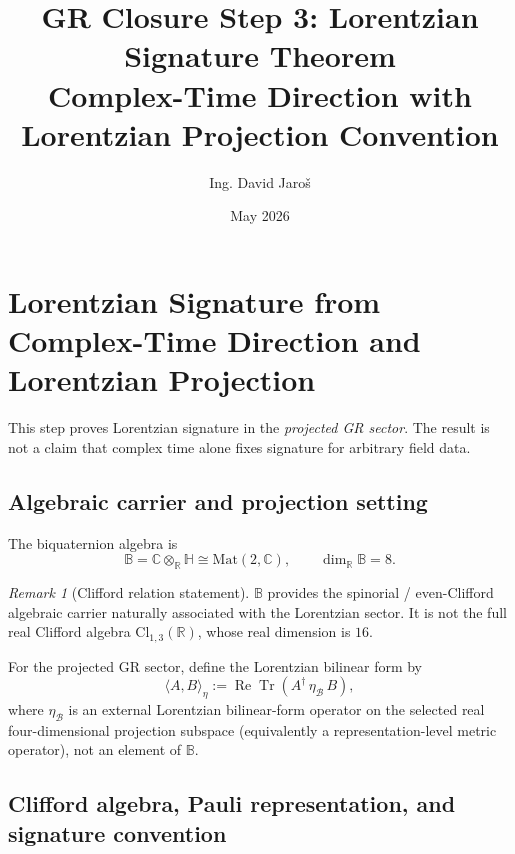 \documentclass[12pt]{article}
\title{\textbf{GR Closure Step 3: Lorentzian Signature Theorem\\
         Complex-Time Direction with Lorentzian Projection Convention}}
\author{Ing. David Jaroš}
\date{May 2026}
\theoremstyle{definition}
\theoremstyle{remark}
\newtheorem{remark}[theorem]{Remark}
\begin{document}
  \maketitle
\fi

\section{Lorentzian Signature from Complex-Time Direction and Lorentzian Projection}
\label{sec:signature_theorem}

\begin{tcolorbox}[colback=blue!5!white,colframe=blue!75!black,title=Scope]
This step proves Lorentzian signature in the \emph{projected GR sector}.  
The result is not a claim that complex time alone fixes signature for arbitrary field data.
\end{tcolorbox}

\subsection{Algebraic carrier and projection setting}

The biquaternion algebra is
\begin{equation}
\mathbb B = \mathbb C\otimes_{\mathbb R}\mathbb H \cong \mathrm{Mat}(2,\mathbb C),
\qquad \dim_{\mathbb R}\mathbb B = 8.
\end{equation}

\begin{remark}[Clifford relation statement]
$\mathbb B$ provides the spinorial / even-Clifford algebraic carrier naturally associated with the Lorentzian sector.
It is not the full real Clifford algebra $\mathrm{Cl}_{1,3}(\mathbb R)$, whose real dimension is $16$.
\end{remark}

For the projected GR sector, define the Lorentzian bilinear form by
\begin{equation}
\label{eq:eta-bilinear-step3}
\langle A,B\rangle_\eta := \operatorname{Re}\operatorname{Tr}\!\left(A^\dagger\,\eta_{\mathcal B}\,B\right),
\end{equation}
where $\eta_{\mathcal B}$ is an external Lorentzian bilinear-form operator on the selected real four-dimensional projection subspace (equivalently a representation-level metric operator), not an element of $\mathbb B$.

\subsection{Clifford algebra, Pauli representation, and signature convention}
\end{document}
